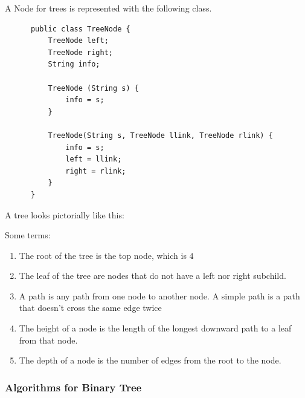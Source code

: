 \documentclass{article}
\begin{document}
      A Node for trees is represented with the following class. 
      \begin{lstlisting}
      public class TreeNode {
          TreeNode left; 
          TreeNode right; 
          String info; 
          
          TreeNode (String s) {
              info = s; 
          }
          
          TreeNode(String s, TreeNode llink, TreeNode rlink) {
              info = s; 
              left = llink; 
              right = rlink; 
          }
      }
      \end{lstlisting}

      A tree looks pictorially like this: 
      \begin{center}
      \end{center}
      Some terms: 
      \begin{enumerate}
          \item The root of the tree is the top node, which is $4$
          \item The leaf of the tree are nodes that do not have a left nor right subchild. 
          \item A path is any path from one node to another node. A simple path is a path that doesn't cross the same edge twice 
          \item The height of a node is the length of the longest downward path to a leaf from that node. 
          \item The depth of a node is the number of edges from the root to the node. 
      \end{enumerate}

    \subsubsection{Algorithms for Binary Tree}
\end{document}
